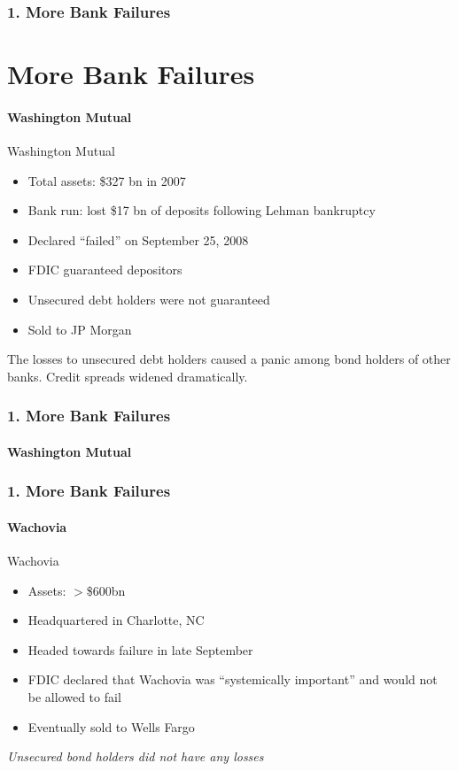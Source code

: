 \documentclass{beamer}
\begin{document}
\begin{frame}[t]
    \frametitle{1. More Bank Failures}
    \section{More Bank Failures}
        \framesubtitle{Washington Mutual}

        Washington Mutual 
        \begin{itemize}
            \item Total assets: \$327 bn in 2007
            \item Bank run: lost \$17 bn of deposits following Lehman bankruptcy
            \item Declared “failed” on September 25, 2008
            \item FDIC guaranteed depositors
            \item Unsecured debt holders were not guaranteed
            \item Sold to JP Morgan
        \end{itemize}
        \vspace{1em}
        
        The losses to unsecured debt holders caused a panic among bond holders of other banks.   Credit spreads widened dramatically.

\end{frame}

\begin{frame}[t]
    \frametitle{1. More Bank Failures}
        \framesubtitle{Washington Mutual}


\end{frame}

\begin{frame}[t]
    \frametitle{1. More Bank Failures}
        \framesubtitle{Wachovia}

    Wachovia
    \begin{itemize}
        \item Assets: $>$\$600bn
        \item Headquartered in Charlotte, NC
        \item Headed towards failure in late September
        \item FDIC declared that Wachovia was “systemically important” and would not be allowed to fail
        \item Eventually sold to Wells Fargo
    \end{itemize}
    \vspace{1em}

    \textit{Unsecured bond holders did not have any losses}

\end{frame}
\end{document}
